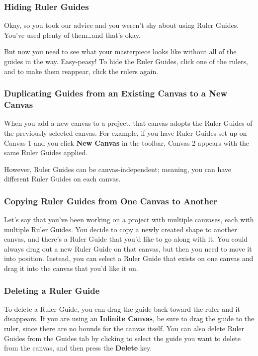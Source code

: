 \documentclass[../main.tex]{subfiles}
\begin{document}
\subsubsection{Hiding Ruler Guides}

Okay, so you took our advice and you weren't shy about using Ruler Guides. You've used plenty of
them\ldots{}and that's okay.

But now you need to see what your masterpiece looks like without all of the guides in the way.
Easy-peasy! To hide the Ruler Guides, click one of the rulers, and to make them reappear,
click the rulers again.

\subsubsection{Duplicating Guides from an Existing Canvas to a New Canvas}

When you add a new canvas to a project, that canvas adopts the Ruler Guides of the previously
selected canvas. For example, if you have Ruler Guides set up on Canvas 1 and you click
\textbf{New Canvas} in the toolbar, Canvas 2 appears with the same Ruler Guides applied.


However, Ruler Guides can be canvas-independent; meaning, you can have different Ruler Guides on
each canvas.

\subsubsection{Copying Ruler Guides from One Canvas to Another}

Let's say that you've been working on a project with multiple canvases, each with multiple Ruler
Guides. You decide to copy a newly created shape to another canvas, and there's a Ruler Guide
that you'd like to go along with it. You could always drag out a new Ruler Guide on that
canvas, but then you need to move it into position. Instead, you can select a Ruler Guide that
exists on one canvas and drag it into the canvas that you'd like it on.


\subsubsection{Deleting a Ruler Guide}

To delete a Ruler Guide, you can drag the guide back toward the ruler and it disappears. If you
are using an \textbf{Infinite Canvas}, be sure to drag the guide to the ruler, since there are
no bounds for the canvas itself. You can also delete Ruler Guides from the Guides tab by
clicking to select the guide you want to delete from the canvas, and then press the
\textbf{Delete} key.
\end{document}
